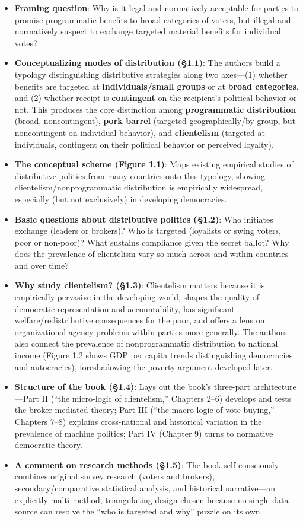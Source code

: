 \documentclass[12pt]{article}
\begin{document}
\begin{itemize}[leftmargin=*, itemsep=4pt]
    \item \textbf{Framing question}: Why is it legal and normatively acceptable for parties to promise programmatic benefits to broad categories of voters, but illegal and normatively suspect to exchange targeted material benefits for individual votes?
    \item \textbf{Conceptualizing modes of distribution (\S1.1)}: The authors build a typology distinguishing distributive strategies along two axes---(1) whether benefits are targeted at \textbf{individuals/small groups} or at \textbf{broad categories}, and (2) whether receipt is \textbf{contingent} on the recipient's political behavior or not. This produces the core distinction among \textbf{programmatic distribution} (broad, noncontingent), \textbf{pork barrel} (targeted geographically/by group, but noncontingent on individual behavior), and \textbf{clientelism} (targeted at individuals, contingent on their political behavior or perceived loyalty).
    \item \textbf{The conceptual scheme (Figure 1.1)}: Maps existing empirical studies of distributive politics from many countries onto this typology, showing clientelism/nonprogrammatic distribution is empirically widespread, especially (but not exclusively) in developing democracies.
    \item \textbf{Basic questions about distributive politics (\S1.2)}: Who initiates exchange (leaders or brokers)? Who is targeted (loyalists or swing voters, poor or non-poor)? What sustains compliance given the secret ballot? Why does the prevalence of clientelism vary so much across and within countries and over time?
    \item \textbf{Why study clientelism? (\S1.3)}: Clientelism matters because it is empirically pervasive in the developing world, shapes the quality of democratic representation and accountability, has significant welfare/redistributive consequences for the poor, and offers a lens on organizational agency problems within parties more generally. The authors also connect the prevalence of nonprogrammatic distribution to national income (Figure 1.2 shows GDP per capita trends distinguishing democracies and autocracies), foreshadowing the poverty argument developed later.
    \item \textbf{Structure of the book (\S1.4)}: Lays out the book's three-part architecture---Part II (``the micro-logic of clientelism,'' Chapters 2--6) develops and tests the broker-mediated theory; Part III (``the macro-logic of vote buying,'' Chapters 7--8) explains cross-national and historical variation in the prevalence of machine politics; Part IV (Chapter 9) turns to normative democratic theory.
    \item \textbf{A comment on research methods (\S1.5)}: The book self-consciously combines original survey research (voters and brokers), secondary/comparative statistical analysis, and historical narrative---an explicitly multi-method, triangulating design chosen because no single data source can resolve the ``who is targeted and why'' puzzle on its own.
\end{itemize}
\end{document}
